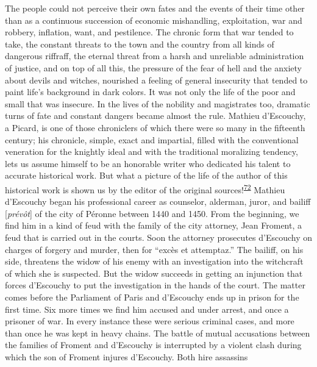 The people could not perceive their own fates and the events of their
time other than as a continuous succession of economic mishandling,
exploitation, war and robbery, inflation, want, and pestilence. The
chronic form that war tended to take, the constant threats to the town
and the country from all kinds of dangerous riffraff, the eternal threat
from a harsh and unreliable administration of justice, and on top of all
this, the pressure of the fear of hell and the anxiety about devils and
witches, nourished a feeling of general insecurity that tended to paint
life's background in dark colors. It
\protect\hypertarget{08_Chapter_One__THE_PASSIONATE_INTE.xhtmlux5cux23page_28}{}{}was
not only the life of the poor and small that was insecure. In the lives
of the nobility and magistrates too, dramatic turns of fate and constant
dangers became almost the rule. Mathieu d'Escouchy, a Picard, is one of
those chroniclers of which there were so many in the fifteenth century;
his chronicle, simple, exact and impartial, filled with the conventional
veneration for the knightly ideal and with the traditional moralizing
tendency, lets us assume himself to be an honorable writer who dedicated
his talent to accurate historical work. But what a picture of the life
of the author of this historical work is shown us by the editor of the
original
sources!\textsuperscript{\protect\hypertarget{08_Chapter_One__THE_PASSIONATE_INTE.xhtmlux5cux23id_2088}{\protect\hyperlink{23_NOTES.xhtmlux5cux23id_2089}{72}}}
Mathieu d'Escouchy began his professional career as counselor, alderman,
juror, and bailiff {[}\emph{prévôt}{]} of the city of Péronne between
1440 and 1450. From the beginning, we find him in a kind of feud with
the family of the city attorney, Jean Froment, a feud that is carried
out in the courts. Soon the attorney prosecutes d'Escouchy on charges of
forgery and murder, then for ``excès et attemptaz.'' The bailiff, on his
side, threatens the widow of his enemy with an investigation into the
witchcraft of which she is suspected. But the widow succeeds in getting
an injunction that forces d'Escouchy to put the investigation in the
hands of the court. The matter comes before the Parliament of Paris and
d'Escouchy ends up in prison for the first time. Six more times we find
him accused and under arrest, and once a prisoner of war. In every
instance these were serious criminal cases, and more than once he was
kept in heavy chains. The battle of mutual accusations between the
families of Froment and d'Escouchy is interrupted by a violent clash
during which the son of Froment injures d'Escouchy. Both hire assassins
